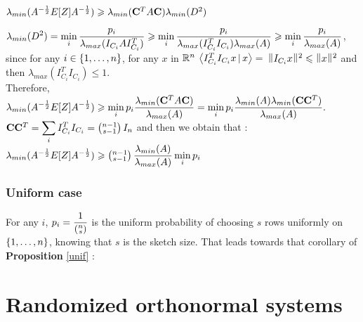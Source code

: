 $\lambda_{min}(A^{-\frac12}E[Z]A^{-\frac12} ) \geq \lambda_{min}(\bold{C}^{T}A \bold{C} ) \lambda_{min}(D^{2})$

$\dsp \lambda_{min}(D^{2}) =  \min_{i}  \frac{p_{i}}{\lambda_{max}(I_{C_{i}} A I_{C_{i}}^{T} ) } \geq  \min_{i}\frac{p_{i} }{\lambda_{max}(I_{C_{i}}^{T} I_{C_{i}}) \lambda_{max}(A)}  \geq \min_{i}\frac{ p_{i} }{\lambda_{max}(A)} $, 
since for any $i\in \acco{1,\dots,n}$, for any $x$ in $\R^{n}$ 
$\scal{I_{C_{i}}^{T} I_{C_{i}} x }{x} =$
$ \norm{ I_{C_{i}}x }^{2} \leq \norm{x}^{2}$
 and then $\lambda_{max}( I_{C_{i}}^{T} I_{C_{i}}  ) \leq 1$.\\
 
 Therefore, 
$\dsp \lambda_{min}(A^{-\frac12}E[Z]A^{-\frac12} ) \geq  \min_{i} p_{i} \frac{\lambda_{min}(\bold{C}^{T}A \bold{C} )}{\lambda_{max}(A)}  =  \min_{i} p_{i} \frac{ \lambda_{min}(A) \lambda_{min}(\bold{C} \bold{C}^{T} )}{\lambda_{max}(A)}.$\\

$\bold{C} \bold{C}^{T}= \dsp\sum\limits_{i} I_{C_{i}}^{T} I_{C_{i}} = \pare{\substack{n-1 \\ s-1}} I_{n} $ and then we obtain that :\\ 


$\dsp \lambda_{min}(A^{-\frac12}E[Z]A^{-\frac12} )  \geq  \dsp \pare{\substack{n-1 \\ s-1}}\frac{\lambda_{min}(A)}{\lambda_{max}(A)}\min_{i} p_{i} $


\subsection{Uniform case}

For any $i$, $p_{i} = \dsp\frac{1}{\pare{\substack{ n \\ s }}}$ is the uniform probability of choosing $s$ rows uniformly on $\acco{1,\dots,n}$, knowing that $s$ is the sketch size. That leads towards that corollary of \textbf{Proposition} \ref{unif} :\\


 
 
 

\chapter{Randomized orthonormal systems}

